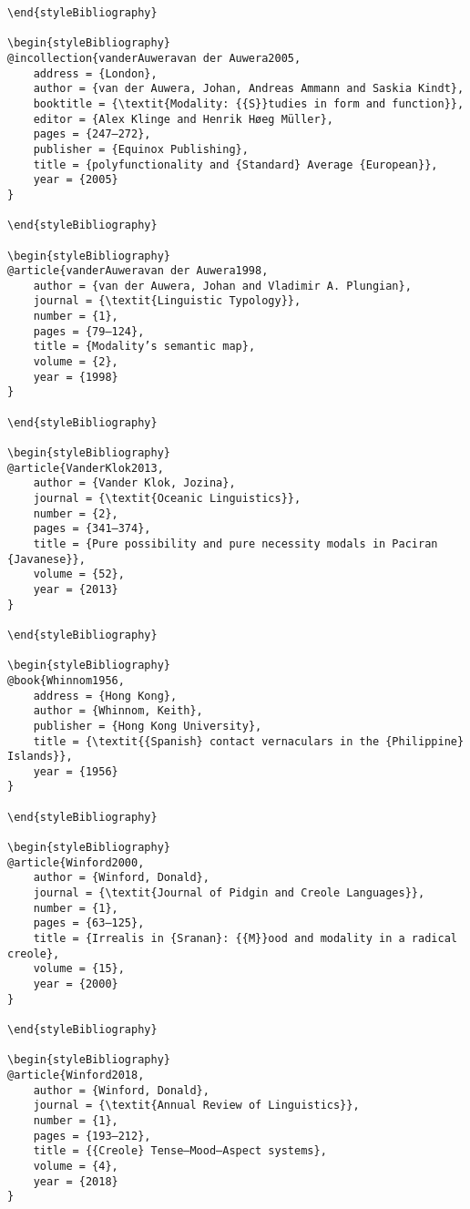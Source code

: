 \begin{stylelsUnNumberedSection}
\begin{verbatim}
\end{styleBibliography}

\begin{styleBibliography}
@incollection{vanderAuweravan der Auwera2005,
	address = {London},
	author = {van der Auwera, Johan, Andreas Ammann and Saskia Kindt},
	booktitle = {\textit{Modality: {{S}}tudies in form and function}},
	editor = {Alex Klinge and Henrik Høeg Müller},
	pages = {247–272},
	publisher = {Equinox Publishing},
	title = {polyfunctionality and {Standard} Average {European}},
	year = {2005}
}

\end{styleBibliography}

\begin{styleBibliography}
@article{vanderAuweravan der Auwera1998,
	author = {van der Auwera, Johan and Vladimir A. Plungian},
	journal = {\textit{Linguistic Typology}},
	number = {1},
	pages = {79–124},
	title = {Modality’s semantic map},
	volume = {2},
	year = {1998}
}

\end{styleBibliography}

\begin{styleBibliography}
@article{VanderKlok2013,
	author = {Vander Klok, Jozina},
	journal = {\textit{Oceanic Linguistics}},
	number = {2},
	pages = {341–374},
	title = {Pure possibility and pure necessity modals in Paciran {Javanese}},
	volume = {52},
	year = {2013}
}

\end{styleBibliography}

\begin{styleBibliography}
@book{Whinnom1956,
	address = {Hong Kong},
	author = {Whinnom, Keith},
	publisher = {Hong Kong University},
	title = {\textit{{Spanish} contact vernaculars in the {Philippine} Islands}},
	year = {1956}
}

\end{styleBibliography}

\begin{styleBibliography}
@article{Winford2000,
	author = {Winford, Donald},
	journal = {\textit{Journal of Pidgin and Creole Languages}},
	number = {1},
	pages = {63–125},
	title = {Irrealis in {Sranan}: {{M}}ood and modality in a radical creole},
	volume = {15},
	year = {2000}
}

\end{styleBibliography}

\begin{styleBibliography}
@article{Winford2018,
	author = {Winford, Donald},
	journal = {\textit{Annual Review of Linguistics}},
	number = {1},
	pages = {193–212},
	title = {{Creole} Tense–Mood–Aspect systems},
	volume = {4},
	year = {2018}
}


\end{verbatim}
\end{stylelsUnNumberedSection}
